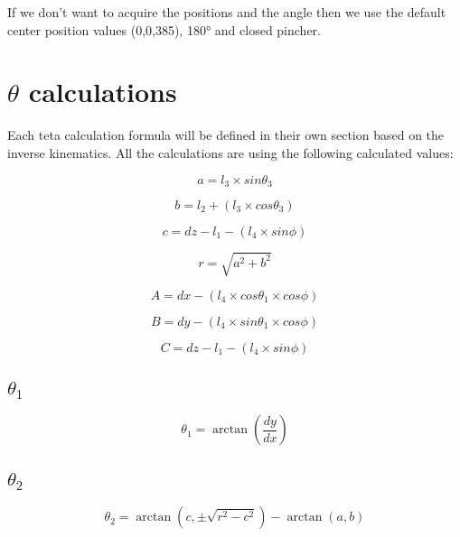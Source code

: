 			\hspace{15pt}If we don't want to acquire the positions and the angle then we use the default center position values (0,0,385), 180° and closed pincher.

	\section{{$\theta$} calculations}\label{calculations}
	
		\hspace{15pt}Each teta calculation formula will be defined in their own section based on the inverse kinematics. All the calculations are using the following calculated values:
		
		\hspace{15pt}\[ a = l_3\times sin\theta_3 \]
		
		\hspace{15pt}\[ b = l_2 + (l_3\times cos\theta_3) \]
		
		\hspace{15pt}\[ c = dz - l_1 - (l_4\times sin\phi) \]
		
		\hspace{15pt}\[ r = \sqrt{a^2+b^2} \]
		
		\hspace{15pt}\[ A = dx - (l_4\times cos\theta_1 \times cos\phi) \]
		
		\hspace{15pt}\[ B = dy - (l_4\times sin\theta_1 \times cos\phi) \]
		
		\hspace{15pt}\[ C = dz - l_1 - (l_4\times sin\phi)\]
		
		\subsection{{$\theta _1$}}
		
			\hspace{15pt}\[ \theta_1 = \arctan(\frac{dy}{dx}) \]
		
			
	
		\subsection{{$\theta _2$}}
		
			\hspace{15pt}\[ \theta_2 = \arctan(c, \pm\sqrt{r^2-c^2}) - \arctan(a,b) \]
		
